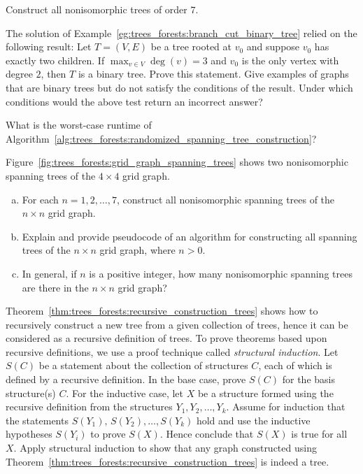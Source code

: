 \begin{problem}
\item Construct all nonisomorphic trees of order $7$.

\item\label{prob:trees_forests:binary_tree_test} The solution of
  Example~\ref{eg:trees_forests:branch_cut_binary_tree} relied on the
  following result: Let $T = (V,E)$ be a tree rooted at $v_0$ and
  suppose $v_0$ has exactly two children. If
  $\max_{v \in V} \deg(v) = 3$ and $v_0$ is the only vertex with
  degree $2$, then $T$ is a binary tree. Prove this statement. Give
  examples of graphs that are binary trees but do not satisfy the
  conditions of the result. Under which conditions would the above
  test return an incorrect answer?

\item What is the worst-case runtime of
  Algorithm~\ref{alg:trees_forests:randomized_spanning_tree_construction}?

\item Figure~\ref{fig:trees_forests:grid_graph_spanning_trees} shows
  two nonisomorphic spanning trees of the $4 \times 4$ grid graph.
  \begin{enumerate}[(a)]
  \item For each $n = 1, 2, \dots, 7$, construct all nonisomorphic
    spanning trees of the $n \times n$ grid graph.

  \item Explain and provide pseudocode of an algorithm for
    constructing all spanning trees of the $n \times n$ grid graph,
    where $n > 0$.

  \item In general, if $n$ is a positive integer, how many
    nonisomorphic spanning trees are there in the $n \times n$ grid
    graph?
  \end{enumerate}

\item Theorem~\ref{thm:trees_forests:recursive_construction_trees}
  shows how to recursively construct a new tree from a given
  collection of trees, hence it can be considered as a recursive
  definition of trees. To prove theorems based upon recursive
  definitions, we use a proof technique called
  \emph{structural induction}. Let $S(C)$   be a statement about the
  collection of structures $C$, each of which is defined by a
  recursive definition. In the base case, prove $S(C)$ for the basis
  structure(s) $C$. For the inductive case, let $X$ be a structure
  formed using the recursive definition from the structures
  $Y_1, Y_2, \dots, Y_k$. Assume for induction that the statements
  $S(Y_1),\, S(Y_2), \dots, S(Y_k)$ hold and use the inductive
  hypotheses $S(Y_i)$ to prove $S(X)$. Hence conclude that $S(X)$ is
  true for all $X$. Apply structural induction to show that any graph
  constructed using
  Theorem~\ref{thm:trees_forests:recursive_construction_trees} is
  indeed a tree.


\end{problem}
